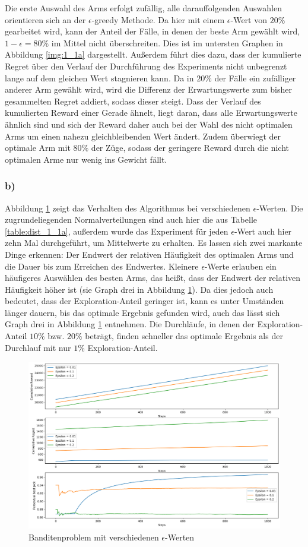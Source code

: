 \documentclass[11pt]{article}
\begin{document}
Die erste Auswahl des Arms erfolgt zufällig, alle darauffolgenden Auswahlen orientieren sich an der $\epsilon$-greedy Methode. Da hier mit einem $\epsilon$-Wert von $20\%$ gearbeitet wird, kann der Anteil der Fälle, in denen der beste Arm gewählt wird, $1-\epsilon = 80\%$ im Mittel nicht überschreiten. Dies ist im untersten Graphen in Abbildung \ref{img:1_1a} dargestellt. Außerdem führt dies dazu, dass der kumulierte Regret über den Verlauf der Durchführung des Experiments nicht unbegrenzt lange auf dem gleichen Wert stagnieren kann. Da in $20\%$ der Fälle ein zufälliger anderer Arm gewählt wird, wird die Differenz der Erwartungswerte zum bisher gesammelten Regret addiert, sodass dieser steigt.
Dass der Verlauf des kumulierten Reward einer Gerade ähnelt, liegt daran, dass alle Erwartungswerte ähnlich sind und sich der Reward daher auch bei der Wahl des nicht optimalen Arms um einen nahezu gleichbleibenden Wert ändert. Zudem überwiegt der optimale Arm mit $80\%$ der Züge, sodass der geringere Reward durch die nicht optimalen Arme nur wenig ins Gewicht fällt. 
\subsubsection*{b)}
Abbildung \ref{img:1_1b} zeigt das Verhalten des Algorithmus bei verschiedenen $\epsilon$-Werten. Die zugrundeliegenden Normalverteilungen sind auch hier die aus Tabelle \ref{table:dist_1_1a}, außerdem wurde das Experiment für jeden $\epsilon$-Wert auch hier zehn Mal durchgeführt, um Mittelwerte zu erhalten. Es lassen sich zwei markante Dinge erkennen: Der Endwert der relativen Häufigkeit des optimalen Arms und die Dauer bis zum Erreichen des Endwertes. Kleinere $\epsilon$-Werte erlauben ein häufigeres Auswählen des besten Arms, das heißt, dass der Endwert der relativen Häufigkeit höher ist (sie Graph drei in Abbildung \ref{img:1_1b}). Da dies jedoch auch bedeutet, dass der Exploration-Anteil geringer ist, kann es unter Umständen länger dauern, bis das optimale Ergebnis gefunden wird, auch das lässt sich Graph drei in Abbildung \ref{img:1_1b} entnehmen. Die Durchläufe, in denen der Exploration-Anteil $10\%$ bzw. $20\%$ beträgt, finden schneller das optimale Ergebnis als der Durchlauf mit nur $1\%$ Exploration-Anteil. 
\begin{figure}[h]
    \centering
    \includegraphics[width=\textwidth]{img/1_1b.png}
    \caption{Banditenproblem mit verschiedenen $\epsilon$-Werten}
    \label{img:1_1b}
\end{figure}
\end{document}
